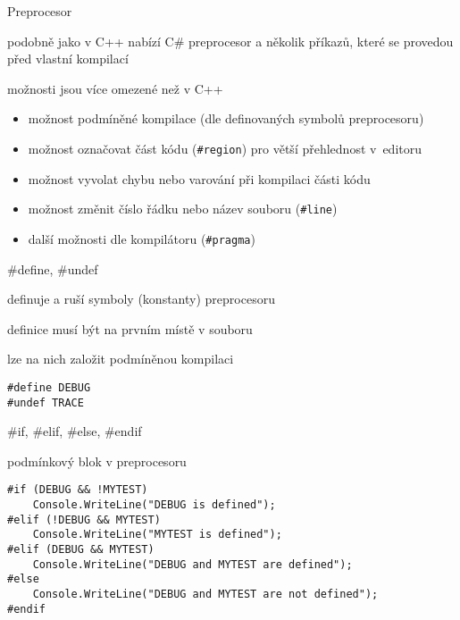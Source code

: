 

\begin{frame}[fragile]
\begin{bitemize}{Preprocesor}
\item podobně jako v C++ nabízí C\# preprocesor a několik příkazů, které se provedou před vlastní kompilací
\item možnosti jsou více omezené než v C++
\begin{itemize}
\item možnost podmíněné kompilace (dle definovaných symbolů preprocesoru)
\item možnost označovat část kódu (\lstinline|#region|) pro větší přehlednost v~editoru
\item možnost vyvolat chybu nebo varování při kompilaci části kódu 
\item možnost změnit číslo řádku nebo název souboru (\lstinline|#line|)
\item další možnosti dle kompilátoru (\lstinline|#pragma|)
\end{itemize}
\end{bitemize}

\end{frame}

\begin{frame}[fragile]
\vfill
\begin{bitemize}{\#define, \#undef}
\item definuje a ruší symboly (konstanty) preprocesoru
\item definice musí být na prvním místě v souboru
\item lze na nich založit podmíněnou kompilaci
\end{bitemize}
\vfill
\begin{yesblock}
\begin{lstlisting}
#define DEBUG
#undef TRACE
\end{lstlisting}
\end{yesblock}
\vfill
\end{frame}




\begin{frame}[fragile]
\vfill
\begin{bitemize}{\#if, \#elif, \#else, \#endif}
\item podmínkový blok v preprocesoru
\end{bitemize}
\vfill
\begin{yesblock}
\begin{lstlisting}
#if (DEBUG && !MYTEST)
    Console.WriteLine("DEBUG is defined");
#elif (!DEBUG && MYTEST)
    Console.WriteLine("MYTEST is defined");
#elif (DEBUG && MYTEST)
    Console.WriteLine("DEBUG and MYTEST are defined");  
#else
    Console.WriteLine("DEBUG and MYTEST are not defined");
#endif
\end{lstlisting}
\end{yesblock}
\vfill
\end{frame}



